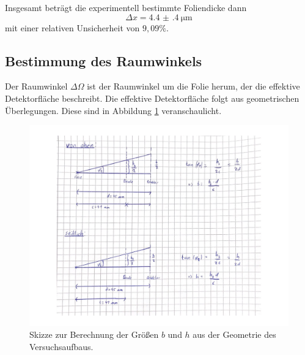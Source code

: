 Insgesamt beträgt die experimentell bestimmte Foliendicke dann
\begin{equation*}
  \Delta x = \SI{4.4(4)}{\micro\metre}
\end{equation*}
mit einer relativen Unsicherheit von $9{,}09\%$.

\subsection{Bestimmung des Raumwinkels}
\label{subsec:raumwinkel}

Der Raumwinkel $\Delta \Omega$ ist der Raumwinkel um die Folie herum, der die
effektive Detektorfläche beschreibt. Die effektive Detektorfläche folgt aus geometrischen
Überlegungen. Diese sind in Abbildung \ref{fig:skizze} veranschaulicht.

\begin{figure}
  \centering
  \includegraphics[width=\textwidth]{images/skizze.pdf}
  \caption{Skizze zur Berechnung der Größen $b$ und $h$ aus der Geometrie des Versuchsaufbaus.}
  \label{fig:skizze}
\end{figure}


